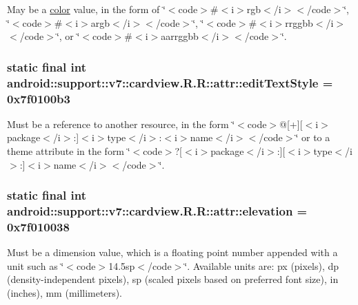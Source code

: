 May be a \hyperlink{classandroid_1_1support_1_1v7_1_1cardview_1_1_r_1_1color}{color} value, in the form of \char`\"{}$<$code$>$\#$<$i$>$rgb$<$/i$>$$<$/code$>$\char`\"{}, \char`\"{}$<$code$>$\#$<$i$>$argb$<$/i$>$$<$/code$>$\char`\"{}, \char`\"{}$<$code$>$\#$<$i$>$rrggbb$<$/i$>$$<$/code$>$\char`\"{}, or \char`\"{}$<$code$>$\#$<$i$>$aarrggbb$<$/i$>$$<$/code$>$\char`\"{}. \hypertarget{classandroid_1_1support_1_1v7_1_1cardview_1_1_r_1_1attr_71c1374df8e312ffda3fa624d396b76d}{
\subsubsection[{editTextStyle}]{\setlength{\rightskip}{0pt plus 5cm}static final int android::support::v7::cardview.R.R::attr::editTextStyle = 0x7f0100b3}}
\label{classandroid_1_1support_1_1v7_1_1cardview_1_1_r_1_1attr_71c1374df8e312ffda3fa624d396b76d}


Must be a reference to another resource, in the form \char`\"{}$<$code$>$@\mbox{[}+\mbox{]}\mbox{[}$<$i$>$package$<$/i$>$:\mbox{]}$<$i$>$type$<$/i$>$:$<$i$>$name$<$/i$>$$<$/code$>$\char`\"{} or to a theme attribute in the form \char`\"{}$<$code$>$?\mbox{[}$<$i$>$package$<$/i$>$:\mbox{]}\mbox{[}$<$i$>$type$<$/i$>$:\mbox{]}$<$i$>$name$<$/i$>$$<$/code$>$\char`\"{}. \hypertarget{classandroid_1_1support_1_1v7_1_1cardview_1_1_r_1_1attr_47b0fb93877cd94f4c735edb4df1bba1}{
\subsubsection[{elevation}]{\setlength{\rightskip}{0pt plus 5cm}static final int android::support::v7::cardview.R.R::attr::elevation = 0x7f010038}}
\label{classandroid_1_1support_1_1v7_1_1cardview_1_1_r_1_1attr_47b0fb93877cd94f4c735edb4df1bba1}


Must be a dimension value, which is a floating point number appended with a unit such as \char`\"{}$<$code$>$14.5sp$<$/code$>$\char`\"{}. Available units are: px (pixels), dp (density-independent pixels), sp (scaled pixels based on preferred font size), in (inches), mm (millimeters). 

